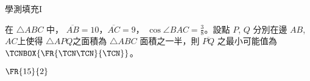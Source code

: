     \begin{QUESTION}
        \begin{ExamInfo}{98}{學測}{填充}{I}
        \end{ExamInfo}
        \begin{ExamAnsRateInfo}{11}{27}{5}{1}
        \end{ExamAnsRateInfo}
        \begin{QBODY}
            在 $\triangle ABC$ 中， $\overline{AB}=10$，$\overline{AC}=9$， $\cos \angle{BAC}= \frac{3}{8}$。設點 $P$, $Q$ 分別在邊 $AB$, $AC$上使得 $\triangle APQ$之面積為 $\triangle ABC$ 面積之一半，則 $\overline{PQ}$ 之最小可能值為 
			$\TCNBOX{\FR{\TCN\TCN}{\TCN}}$。
        \end{QBODY}
        \begin{QFROMS}
        \end{QFROMS}
        \begin{QTAGS}\end{QTAGS}
        \begin{QANS}
            $\FR{15}{2}$
        \end{QANS}
        \begin{QSOLLIST}
        \end{QSOLLIST}
        \begin{QEMPTYSPACE}
        \end{QEMPTYSPACE}
    \end{QUESTION}

